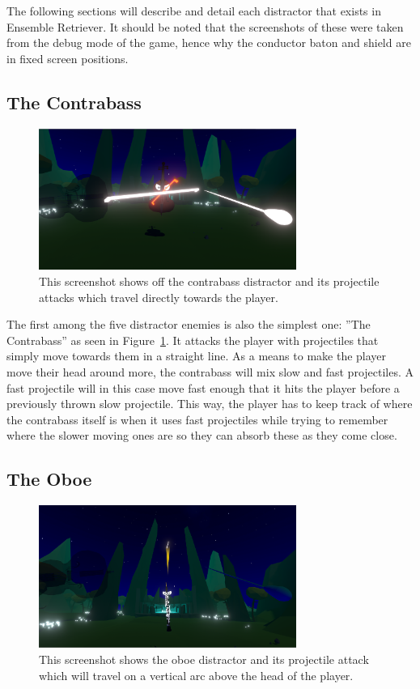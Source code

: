 The following sections will describe and detail each distractor that exists in Ensemble Retriever. It should be noted that the screenshots of these were taken from the debug mode of the game, hence why the conductor baton and shield are in fixed screen positions.

\subsection{The Contrabass}
\begin{figure}[tbph]
    \centering
    \includegraphics[width=0.75\textwidth]{figures/screenshots/contrabass.png}
    \caption[The Contrabass Distractor]{This screenshot shows off the contrabass distractor and its projectile attacks which travel directly towards the player.}
    \label{fig:contrabassDistractor}
\end{figure}
The first among the five distractor enemies is also the simplest one: ''The Contrabass'' as seen in Figure~\ref{fig:contrabassDistractor}. It attacks the player with projectiles that simply move towards them in a straight line. As a means to make the player move their head around more, the contrabass will mix slow and fast projectiles. A fast projectile will in this case move fast enough that it hits the player before a previously thrown slow projectile. This way, the player has to keep track of where the contrabass itself is when it uses fast projectiles while trying to remember where the slower moving ones are so they can absorb these as they come close. 
 
\subsection{The Oboe}
\begin{figure}[tbph]
    \centering
    \includegraphics[width=0.75\textwidth]{figures/screenshots/oboe.png}
    \caption[The Oboe Distractor]{This screenshot shows the oboe distractor and its projectile attack which will travel on a vertical arc above the head of the player.}
    \label{fig:oboeDistractor}
\end{figure}

